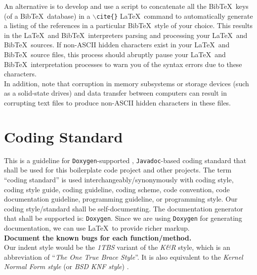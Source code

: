 \documentclass[letter,12pt]{article}
\begin{document}
An alternative is to develop and use a script to concatenate all the {\sc Bib}\TeX\ keys (of a {\sc Bib}\TeX\ database) in a {\tt $\backslash$cite\{\}} \LaTeX\ command to automatically generate a listing of the references in a particular {\sc Bib}\TeX\ style of your choice. This results in the \LaTeX\ and {\sc Bib}\TeX\ interpreters parsing and processing your \LaTeX\ and {\sc Bib}\TeX\ sources. If non-ASCII hidden characters exist in your \LaTeX\ and {\sc Bib}\TeX\ source files, this process should abruptly pause your \LaTeX\ and {\sc Bib}\TeX\ interpretation processes to warn you of the syntax errors due to these characters. \\

In addition, note that corruption in memory subsystems or storage devices (such as a solid-state drives) and data transfer between computers can result in corrupting text files to produce non-ASCII hidden characters in these files.





\section{Coding Standard}
\label{sec:CodingStandard}

This is a guideline for {\tt Doxygen}-supported \cite{vanHeesch2016}, {\tt Javadoc}-based \cite{Long1995} coding standard that shall be used for this boilerplate code project and other projects. The term ``coding standard'' is used interchangeably/synonymously with coding style, coding style guide, coding guideline, coding scheme, code convention, code documentation guideline, programming guideline, or programming style. Our coding style/standard shall be self-documenting. The documentation generator that shall be supported is: {\tt Doxygen}. Since we are using {\tt Doxygen} for generating documentation, we can use \LaTeX\ to provide richer markup. \\

{\bf Document the known bugs for each function/method.} \\

Our indent style would be the {\it 1TBS} variant of the {\it K{\rm \&}R} style, which is an abbreviation of ``{\it The One True Brace Style}''. It is also equivalent to the {\it Kernel Normal Form style} (or {\it BSD KNF style}) \cite{WikipediaContributors2016j}. \\
\end{document}
